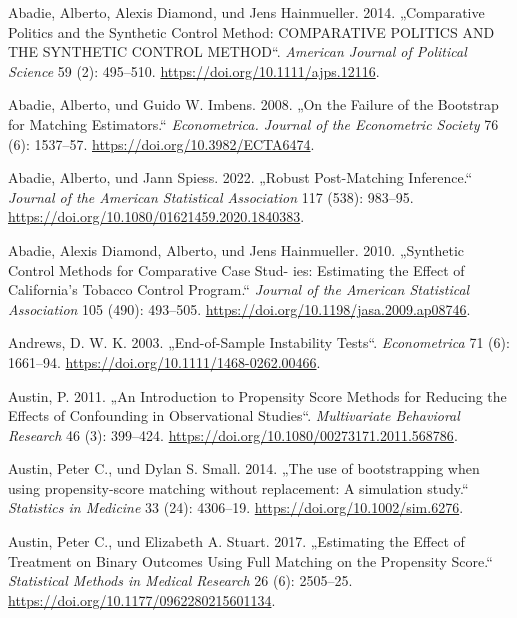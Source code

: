 \documentclass[
  a4paper,
  DIV=11,
  oneside]{scrreprt}
\newlength{\cslhangindent}
\newenvironment{CSLReferences}[2] %
 {\begin{list}{}{%
  \setlength{\itemindent}{0pt}
  \setlength{\leftmargin}{0pt}
  \setlength{\parsep}{0pt}
  \ifodd #1
   \setlength{\leftmargin}{\cslhangindent}
   \setlength{\itemindent}{-1\cslhangindent}
  \fi
  \setlength{\itemsep}{#2\baselineskip}}}
 {\end{list}}
\begin{document}
\label{refs}
\begin{CSLReferences}{1}{0}
Abadie, Alberto, Alexis Diamond, und Jens Hainmueller. 2014.
{„Comparative Politics and the Synthetic Control Method: COMPARATIVE
POLITICS AND THE SYNTHETIC CONTROL METHOD``}. \emph{American Journal of
Political Science} 59 (2): 495--510.
\url{https://doi.org/10.1111/ajps.12116}.

Abadie, Alberto, und Guido W. Imbens. 2008. {„On the Failure of the
Bootstrap for Matching Estimators.``} \emph{Econometrica. Journal of the
Econometric Society} 76 (6): 1537--57.
\url{https://doi.org/10.3982/ECTA6474}.

Abadie, Alberto, und Jann Spiess. 2022. {„Robust Post-Matching
Inference.``} \emph{Journal of the American Statistical Association} 117
(538): 983--95. \url{https://doi.org/10.1080/01621459.2020.1840383}.

Abadie, Alexis Diamond, Alberto, und Jens Hainmueller. 2010. {„Synthetic
Control Methods for Comparative Case Stud- ies: Estimating the Effect of
California's Tobacco Control Program.``} \emph{Journal of the American
Statistical Association} 105 (490): 493--505.
\url{https://doi.org/10.1198/jasa.2009.ap08746}.

Andrews, D. W. K. 2003. {„End-of-Sample Instability Tests``}.
\emph{Econometrica} 71 (6): 1661--94.
\url{https://doi.org/10.1111/1468-0262.00466}.

Austin, P. 2011. {„An Introduction to Propensity Score Methods for
Reducing the Effects of Confounding in Observational Studies``}.
\emph{Multivariate Behavioral Research} 46 (3): 399--424.
\url{https://doi.org/10.1080/00273171.2011.568786}.

Austin, Peter C., und Dylan S. Small. 2014. {„The use of bootstrapping
when using propensity-score matching without replacement: A simulation
study.``} \emph{Statistics in Medicine} 33 (24): 4306--19.
\url{https://doi.org/10.1002/sim.6276}.

Austin, Peter C., und Elizabeth A. Stuart. 2017. {„Estimating the Effect
of Treatment on Binary Outcomes Using Full Matching on the Propensity
Score.``} \emph{Statistical Methods in Medical Research} 26 (6):
2505--25. \url{https://doi.org/10.1177/0962280215601134}.


\end{CSLReferences}
\end{document}
